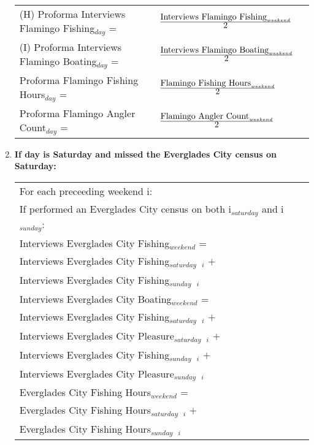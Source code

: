 \documentclass[letterpaper,12pt]{article}
\newcommand{\hspacer}{\hspace*{1cm}}
\newcommand{\fraction}[1]{\textrm{\normalsize{#1}}}
\begin{document}
\begin{enumerate}
\begin{tabular}{l@{ }l@{ }l}
	(H) Proforma Interviews Flamingo Fishing$_{day}$ =
		& $
\frac
	{\fraction{Interviews Flamingo Fishing}_{weekend}}
      	{\fraction{2}}
		$ \\
	(I) Proforma Interviews Flamingo Boating$_{day}$ =
		& $
\frac
	{\fraction{Interviews Flamingo Boating}_{weekend}}
      	{\fraction{2}}
		$ \\
	Proforma Flamingo Fishing Hours$_{day}$ =
		& $
\frac
	{\fraction{Flamingo Fishing Hours}_{weekend}}
      	{\fraction{2}}
		$ \\
	Proforma Flamingo Angler Count$_{day}$ =
		& $
\frac
	{\fraction{Flamingo Angler Count}_{weekend}}
      	{\fraction{2}}
		$ \\
\end{tabular}

\item
\textbf{If day is Saturday and missed the Everglades City census on Saturday:} \\
\begin{tabular}{l@{ }l@{ }l}
	For each preceeding weekend i: \\
\hspacer If performed an Everglades City census on both i$_{saturday}$ and i$_{sunday}$: \\
\hspacer \hspacer Interviews Everglades City Fishing$_{weekend}$ = \\
\hspacer \hspacer \hspacer Interviews Everglades City Fishing$_{saturday}$\ $_{i}$ $+$ \\
\hspacer \hspacer \hspacer Interviews Everglades City Fishing$_{sunday}$\ $_{i}$ \\

\hspacer \hspacer Interviews Everglades City Boating$_{weekend}$ = \\
\hspacer \hspacer \hspacer Interviews Everglades City Fishing$_{saturday}$\ $_{i}$ $+$ \\
\hspacer \hspacer \hspacer Interviews Everglades City Pleasure$_{saturday}$\ $_{i}$ $+$ \\
\hspacer \hspacer \hspacer Interviews Everglades City Fishing$_{sunday}$\ $_{i}$ $+$ \\
\hspacer \hspacer \hspacer Interviews Everglades City Pleasure$_{sunday}$\ $_{i}$ \\

\hspacer \hspacer Everglades City Fishing Hours$_{weekend}$ = \\
\hspacer \hspacer \hspacer Everglades City Fishing Hours$_{saturday}$\ $_{i}$ $+$ \\
\hspacer \hspacer \hspacer Everglades City Fishing Hours$_{sunday}$\ $_{i}$ \\


\end{tabular}
\end{enumerate}
\end{document}
